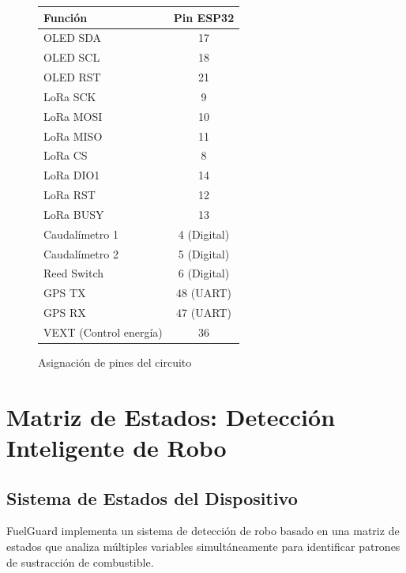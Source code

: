 \documentclass[12pt,a4paper,oneside]{report}
\begin{document}
\begin{figure}[H]
    \centering
    \begin{tabular}{|l|c|}
        \hline
        \textbf{Función} & \textbf{Pin ESP32} \\
        \hline
        OLED SDA & 17 \\
        OLED SCL & 18 \\
        OLED RST & 21 \\
        LoRa SCK & 9 \\
        LoRa MOSI & 10 \\
        LoRa MISO & 11 \\
        LoRa CS & 8 \\
        LoRa DIO1 & 14 \\
        LoRa RST & 12 \\
        LoRa BUSY & 13 \\
        Caudalímetro 1 & 4 (Digital) \\
        Caudalímetro 2 & 5 (Digital) \\
        Reed Switch & 6 (Digital) \\
        GPS TX & 48 (UART) \\
        GPS RX & 47 (UART) \\
        VEXT (Control energía) & 36 \\
        \hline
    \end{tabular}
    \caption{Asignación de pines del circuito}
\end{figure}

\chapter{Matriz de Estados: Detección Inteligente de Robo}

\section{Sistema de Estados del Dispositivo}

FuelGuard implementa un sistema de detección de robo basado en una matriz de estados que analiza múltiples variables simultáneamente para identificar patrones de sustracción de combustible.
\end{document}
